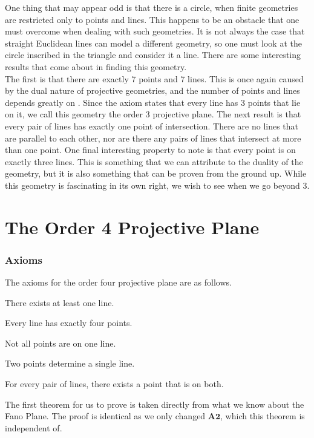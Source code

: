 \documentclass{article}
\newenvironment{axioms}
 {\enumerate[label=\textbf{A\arabic*.}, ref=A\arabic*]}
 {\endenumerate}
\begin{document}
One thing that may appear odd is that there is a circle, when finite geometries are restricted only to points and lines. This happens to be an obstacle that one must overcome when dealing with such geometries. It is not always the case that straight Euclidean lines can model a different geometry, so one must look at the circle inscribed in the triangle and consider it a line. There are some interesting results that come about in finding this geometry. \\

The first is that there are exactly 7 points and 7 lines. This is once again caused by the dual nature of projective geometries, and the number of points and lines depends greatly on . Since the axiom states that every line has 3 points that lie on it, we call this geometry the order 3 projective plane. The next result is that every pair of lines has exactly one point of intersection. There are no lines that are parallel to each other, nor are there any pairs of lines that intersect at more than one point. One final interesting property to note is that every point is on exactly three lines. This is something that we can attribute to the duality of the geometry, but it is also something that can be proven from the ground up. While this geometry is fascinating in its own right, we wish to see when we go beyond 3.
\section{The Order 4 Projective Plane}
\subsubsection{Axioms}
The axioms for the order four projective plane are as follows.
\begin{axioms}
  \item There exists at least one line.
  \item Every line has exactly four points.
  \item Not all points are on one line.
  \item Two points determine a single line.
  \item For every pair of lines, there exists a point that is on both.
\end{axioms}

The first theorem for us to prove is taken directly from what we know about the Fano Plane. The proof is identical as we only changed $\mathbf{A2}$, which this theorem is independent of.
\end{document}
